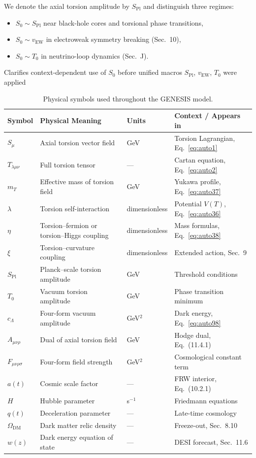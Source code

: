 \documentclass{article}
\newcommand{\Splanck}{\ensuremath{S_{\mathrm{Pl}}}}
\newcommand{\vEW}{\ensuremath{v_{\mathrm{EW}}}}
\begin{document}
We denote the axial torsion amplitude by $\Splanck$ and distinguish three regimes:
\begin{itemize}
  \item $S_0 \sim S_{\text{Pl}}$ near black-hole cores and torsional phase transitions,
  \item $S_0 \sim v_{\text{EW}}$ in electroweak symmetry breaking (Sec.~10),
  \item $S_0 \sim T_0$ in neutrino-loop dynamics (Sec.~J).
\end{itemize}

Clarifies context-dependent use of $S_0$ before unified macros $\Splanck$, $\vEW$, $T_0$ were applied

\begin{table}[h!]
\centering
\caption{Physical symbols used throughout the GENESIS model.}
\begin{tabular}{llll}
\toprule
\textbf{Symbol} & \textbf{Physical Meaning} & \textbf{Units} & \textbf{Context / Appears in} \\
\midrule
$S_\mu$ & Axial torsion vector field & GeV & Torsion Lagrangian, Eq.~\ref{eq:auto1} \\
$T_{\lambda\mu\nu}$ & Full torsion tensor & — & Cartan equation, Eq.~\ref{eq:auto2} \\
$m_T$ & Effective mass of torsion field & GeV & Yukawa profile, Eq.~\eqref{eq:auto37} \\
$\lambda$ & Torsion self-interaction & dimensionless & Potential $V(T)$, Eq.~\ref{eq:auto36} \\
$\eta$ & Torsion–fermion or torsion–Higgs coupling & dimensionless & Mass formulas, Eq.~\ref{eq:auto38} \\
$\xi$ & Torsion–curvature coupling & dimensionless & Extended action, Sec.~9 \\
$S_{\text{Pl}}$ & Planck–scale torsion amplitude & GeV & Threshold conditions \\
$T_0$ & Vacuum torsion amplitude & GeV & Phase transition minimum \\
$c_\Lambda$ & Four-form vacuum amplitude & GeV$^2$ & Dark energy, Eq.~\ref{eq:auto98} \\
$A_{\mu\nu\rho}$ & Dual of axial torsion field & GeV & Hodge dual, Eq.~(11.4.1) \\
$F_{\mu\nu\rho\sigma}$ & Four-form field strength & GeV$^2$ & Cosmological constant term \\
$a(t)$ & Cosmic scale factor & — & FRW interior, Eq.~(10.2.1) \\
$H$ & Hubble parameter & s$^{-1}$ & Friedmann equations \\
$q(t)$ & Deceleration parameter & — & Late-time cosmology \\
$\Omega_{\text{DM}}$ & Dark matter relic density & — & Freeze-out, Sec.~8.10 \\
$w(z)$ & Dark energy equation of state & — & DESI forecast, Sec.~11.6 \\
\bottomrule
\end{tabular}
\end{table}
\end{document}
